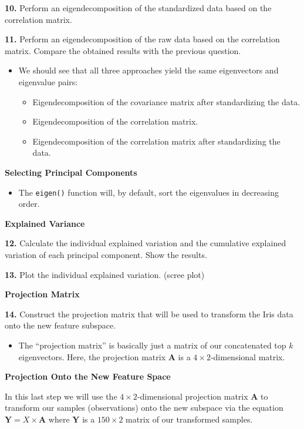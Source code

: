 \documentclass[]{book}
\providecommand{\tightlist}{%
  \setlength{\itemsep}{0pt}\setlength{\parskip}{0pt}}
\newenvironment{rmdblock}[1]
  {\begin{shaded*}
  \begin{itemize}
  \renewcommand{\labelitemi}{
    \raisebox{-.7\height}[0pt][0pt]{
      {\setkeys{Gin}{width=2em,keepaspectratio}\texttt{[image: img/icons/\#1]}}
    }
  }
  \item
  }
  {
  \end{itemize}
  \end{shaded*}
  }
\newenvironment{rmdinsight}
  {\begin{rmdblock}{insight}}
  {\end{rmdblock}}
\newenvironment{rmdtip}
  {\begin{rmdblock}{tip}}
  {\end{rmdblock}}
\theoremstyle{definition}
\theoremstyle{definition}
\theoremstyle{definition}
\theoremstyle{remark}
\begin{document}
\textbf{10.} Perform an eigendecomposition of the standardized data
based on the correlation matrix.

\textbf{11.} Perform an eigendecomposition of the raw data based on the
correlation matrix. Compare the obtained results with the previous
question.

\begin{rmdinsight}
We should see that all three approaches yield the same eigenvectors and
eigenvalue pairs:

\begin{itemize}
\tightlist
\item
  Eigendecomposition of the covariance matrix after standardizing the
  data.
\item
  Eigendecomposition of the correlation matrix.
\item
  Eigendecomposition of the correlation matrix after standardizing the
  data.
\end{itemize}
\end{rmdinsight}

\textbf{Selecting Principal Components}

\begin{rmdinsight}
The \texttt{eigen()} function will, by default, sort the eigenvalues in
decreasing order.
\end{rmdinsight}

\textbf{Explained Variance}

\textbf{12.} Calculate the individual explained variation and the
cumulative explained variation of each principal component. Show the
results.

\textbf{13.} Plot the individual explained variation. (scree plot)

\textbf{Projection Matrix}

\textbf{14.} Construct the projection matrix that will be used to
transform the Iris data onto the new feature subspace.

\begin{rmdtip}
The ``projection matrix'' is basically just a matrix of our concatenated
top \(k\) eigenvectors. Here, the projection matrix \(\mathbf{A}\) is a
\(4 \times 2\)-dimensional matrix.
\end{rmdtip}

\textbf{Projection Onto the New Feature Space}

In this last step we will use the \(4 \times 2\)-dimensional projection
matrix \(\mathbf{A}\) to transform our samples (observations) onto the
new subspace via the equation \(\mathbf{Y}=X \times \mathbf{A}\) where
\(\mathbf{Y}\) is a \(150 \times 2\) matrix of our transformed samples.
\end{document}
